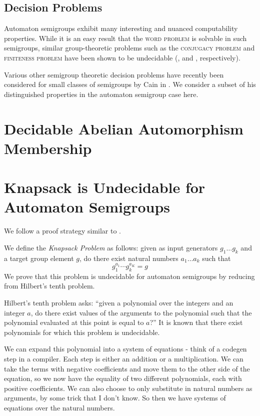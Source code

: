 \documentclass[10pt]{article}
\newcommand{\defn}[1]{\textit{#1}}
\newcommand{\decprob}[1]{\textsc{#1}}
\begin{document}

\subsection*{Decision Problems}
Automaton semigroups exhibit many interesting and nuanced
computability properties. While it is an easy result that the
\decprob{word problem} is solvable in such semigroups, similar
group-theoretic problems such as the \decprob{conjugacy problem} and
\decprob{finiteness problem} have been shown to be undecidable
(\cite{sunic:conj}, and \cite{gillibert:finite}, respectively).

Various other semigroup theoretic decision problems have recently been
considered for small classes of semigroups by Cain in
\cite{Cain09:dec_prob}. We consider a subset of his distinguished
properties in the automaton semigroup case here.


\section{Decidable Abelian Automorphism Membership}

\section{Knapsack is Undecidable for Automaton Semigroups}
We follow a proof strategy similar to \cite{Konig15:knapsack}.

We define the \defn{Knapsack Problem} as follows: given as input
generators $g_1 \ldots g_k$ and a target group element $g$, do there
exist natural numbers $a_1\ldots a_k$ such that
\[ g_1^{a_1} \cdots g_k^{a_K} = g \] We prove that this problem is
undecidable for automaton semigroups by reducing from %
Hilbert's tenth problem.

Hilbert's tenth problem asks: ``given a polynomial over the integers
and an integer $a$, do there exist values of the arguments to the
polynomial such that the polynomial evaluated at this point is equal
to $a$?'' It is known that there exist polynomials for which this
problem is undecidable.

We can expand this polynomial into a system of equations - think of a
codegen step in a compiler. Each step is either an addition or a
multiplication. We can take the terms with negative coefficients and
move them to the other side of the equation, so we now have the
equality of two different polynomials, each with positive
coefficients. We can also choose to only substitute in natural numbers
as arguments, by some trick that I don't know. So then we have systems
of equations over the natural numbers.
\end{document}
